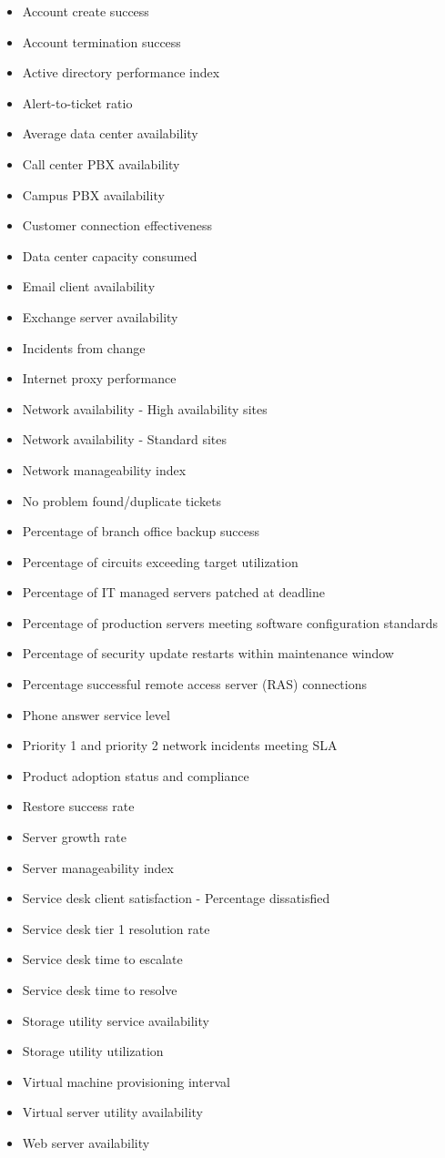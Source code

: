 \documentclass[]{book}
\providecommand{\tightlist}{%
  \setlength{\itemsep}{0pt}\setlength{\parskip}{0pt}}
\begin{document}
\begin{itemize}
\tightlist
\item
  Account create success
\item
  Account termination success
\item
  Active directory performance index
\item
  Alert-to-ticket ratio
\item
  Average data center availability
\item
  Call center PBX availability
\item
  Campus PBX availability
\item
  Customer connection effectiveness
\item
  Data center capacity consumed
\item
  Email client availability
\item
  Exchange server availability
\item
  Incidents from change
\item
  Internet proxy performance
\item
  Network availability - High availability sites
\item
  Network availability - Standard sites
\item
  Network manageability index
\item
  No problem found/duplicate tickets
\item
  Percentage of branch office backup success
\item
  Percentage of circuits exceeding target utilization
\item
  Percentage of IT managed servers patched at deadline
\item
  Percentage of production servers meeting software configuration
  standards
\item
  Percentage of security update restarts within maintenance window
\item
  Percentage successful remote access server (RAS) connections
\item
  Phone answer service level
\item
  Priority 1 and priority 2 network incidents meeting SLA
\item
  Product adoption status and compliance
\item
  Restore success rate
\item
  Server growth rate
\item
  Server manageability index
\item
  Service desk client satisfaction - Percentage dissatisfied
\item
  Service desk tier 1 resolution rate
\item
  Service desk time to escalate
\item
  Service desk time to resolve
\item
  Storage utility service availability
\item
  Storage utility utilization
\item
  Virtual machine provisioning interval
\item
  Virtual server utility availability
\item
  Web server availability
\end{itemize}
\end{document}

